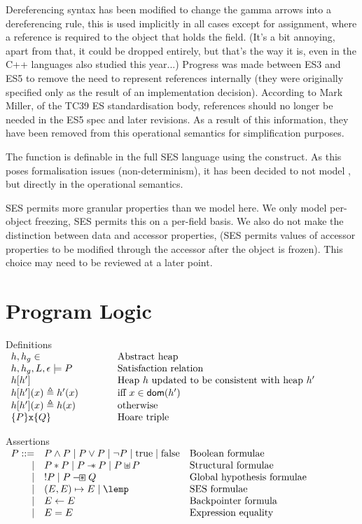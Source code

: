 \documentclass[a4paper]{article}
\begin{document}
Dereferencing syntax has been modified to change the gamma arrows into a
dereferencing rule, this is used implicitly in all cases except for assignment,
where a reference is required to the object that holds the field. (It's a bit
annoying, apart from that, it could be dropped entirely, but that's the way it
is, even in the C++ languages also studied this year...)
Progress was
made between ES3 and ES5 to remove the need to represent references internally
(they were originally specified only as the result of an implementation
decision). According to Mark Miller, of the TC39 ES standardisation body,
references should no longer be needed in the ES5 spec and later revisions. As a
result of this information, they have been removed from this operational
semantics for simplification purposes.

The  function is definable in the full SES language using the
 construct. As this poses formalisation issues (non-determinism),
it has been decided to not model , but  directly in the
operational semantics.

SES permits more granular properties than we model here. We only model
per-object freezing, SES permits this on a per-field basis. We also do not make
the distinction between data and accessor properties, (SES permits values of
accessor properties to be modified through the accessor after the object is
frozen). This choice may need to be reviewed at a later point.

\section{Program Logic}

\newcommand{\defline}[2]{#1 & \qquad & \text{#2}\\}
\begin{display}{Definitions}
  $\begin{array}{lll}
    \defline{h,h_g \in}{Abstract heap}
    \defline{h,h_g,L,\env \satisfies P}{Satisfaction relation}
    \defline{h[h']}{Heap $h$ updated to be consistent with heap $h'$}
    \defline{h[h'](x) \triangleq h'(x)}{iff $x \in \dom(h')$}
    \defline{h[h'](x) \triangleq h(x)}{otherwise}
    \defline{\tr{P}{\js{x}}{Q}}{Hoare triple}
  \end{array}$
\end{display}

\newcommand{\asrtline}[3][\pipe]{#1 & #2 & \text{#3}\\}
\begin{display}{Assertions}
  $\begin{array}{rll}
    \asrtline[P ::=]{P \land P \pipe P \lor P \pipe \lnot P \pipe \true \pipe
    \false}{Boolean formulae}
    \asrtline{P \sep P \pipe P \wand P \pipe P \sepish P}{Structural formulae}
    \asrtline{\upd P \pipe P \hysep Q}{Global hypothesis formulae}
    \asrtline{(E,E) \pointsto E \pipe \lemp}{SES formulae}
    \asrtline{E \bp E}{Backpointer formula}
    \asrtline{E = E}{Expression equality}
  \end{array}$
\end{display}
\end{document}

